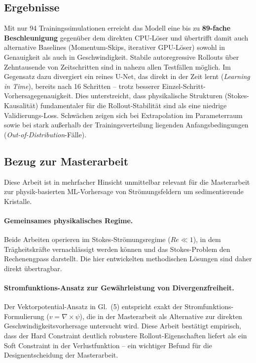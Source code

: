 \documentclass[a4paper,12pt]{article}
\begin{document}
\subsection*{Ergebnisse}

Mit nur 94 Trainingssimulationen erreicht das Modell eine bis zu
\textbf{89-fache Beschleunigung} gegen\"uber dem direkten CPU-L\"oser und
\"ubertrifft damit auch alternative Baselines (Momentum-Skips, iterativer
GPU-L\"oser) sowohl in Genauigkeit als auch in Geschwindigkeit.
Stabile autoreg\-ressive Rollouts \"uber Zehntausende von Zeitschritten
sind in nahezu allen Testf\"allen m\"oglich. Im Gegensatz dazu divergiert
ein reines U-Net, das direkt in der Zeit lernt (\emph{Learning in Time}),
bereits nach 16 Schritten -- trotz besserer Einzel-Schritt-Vorhersagegenauigkeit.
Dies unterstreicht, dass physikalische Strukturen (Stokes-Kausalit\"at)
fundamentaler f\"ur die Rollout-Stabilit\"at sind als eine niedrige
Validierungs-Loss. Schw\"achen zeigen sich bei Extrapolation im Parameterraum
sowie bei stark au{\ss}erhalb der Trainingsverteilung liegenden
Anfangsbedingungen (\emph{Out-of-Distribution}-F\"alle).

\subsection*{Bezug zur Masterarbeit}

Diese Arbeit ist in mehrfacher Hinsicht unmittelbar relevant f\"ur die
Masterarbeit zur physik-basierten ML-Vorhersage von Str\"omungsfeldern
um sedimentierende Kristalle.

\paragraph{Gemeinsames physikalisches Regime.}
Beide Arbeiten operieren im Stokes-Str\"omungsregime ($Re \ll 1$), in dem
Tr\"agheitskr\"afte vernachl\"assigt werden k\"onnen und das Stokes-Problem
den Rechenengpass darstellt. Die hier entwickelten methodischen L\"osungen
sind daher direkt \"ubertragbar.

\paragraph{Stromfunktions-Ansatz zur Gew\"ahrleistung von Divergenzfreiheit.}
Der Vektorpotential-Ansatz in Gl.\ (5) entspricht exakt der Stromfunktions-
Formulierung ($v = \nabla \times \psi$), die in der Masterarbeit als Alternative
zur direkten Geschwindigkeitsvorhersage untersucht wird. Diese Arbeit
best\"atigt empirisch, dass der Hard Constraint deutlich robustere
Rollout-Eigenschaften liefert als ein Soft Constraint in der Verlustfunktion --
ein wichtiger Befund f\"ur die Designentscheidung der Masterarbeit.
\end{document}
